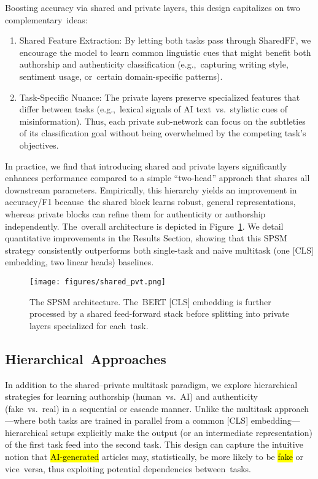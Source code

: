 \documentclass[electronics,article,accept,pdftex,moreauthors,electronics]{Definitions/mdpi}
\begin{document}
Boosting accuracy via shared and private layers, this design capitalizes on two complementary~ideas:
\begin{enumerate}
    \item Shared Feature Extraction: By letting both tasks pass through $\mathrm{SharedFF}$, 
    we encourage the model to learn common linguistic cues that might benefit both authorship and authenticity classification (e.g.,~capturing writing style, sentiment usage, or~certain domain-specific patterns).
    \item Task-Specific Nuance: The private layers preserve 
    specialized features that differ between tasks (e.g.,~lexical signals of AI text~vs.~stylistic cues of misinformation). Thus, each private sub-network can focus on the subtleties of its classification goal without being overwhelmed by the competing 
    task’s objectives.
\end{enumerate}


In practice, we find that introducing shared and private layers significantly enhances performance compared to a simple “two-head” approach that shares all downstream parameters. Empirically, this hierarchy yields an improvement in accuracy/F1 because~the shared block learns robust, general representations, whereas private blocks can refine them for authenticity or authorship independently. The~overall architecture is depicted in Figure~\ref{fig7}. 
We detail quantitative improvements in the Results Section, showing that this SPSM strategy consistently outperforms both single-task and naive 
multitask (one [CLS] embedding, two linear heads) baselines.

\begin{figure}[H] %
    \texttt{[image: figures/shared\_pvt.png]}
    \caption{The SPSM architecture. The~BERT [CLS] embedding is further processed by a shared feed-forward stack before splitting into private layers specialized for each~task.}
    \label{fig7}
\end{figure}



\subsection{Hierarchical~Approaches}

In addition to the shared--private multitask paradigm, we explore hierarchical strategies for learning authorship (human~vs.~AI) and authenticity (fake~vs.~real) in a 
sequential or cascade manner. Unlike the multitask approach---where both tasks are trained in parallel from a common [CLS] embedding---hierarchical setups explicitly make the output (or an intermediate representation) of the first task feed into the second task. This design can capture the intuitive notion that \hl{AI-generated} %
articles may, statistically, be more likely to be \hl{fake} or vice~versa, thus exploiting potential dependencies between~tasks.
\end{document}
